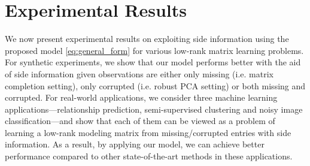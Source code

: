 \documentclass[twoside,11pt]{article}
\begin{document}
\section{Experimental Results}
\label{sec:exp}
We now present experimental results on exploiting side information using the proposed
model \eqref{eq:general_form} for various low-rank matrix learning problems.
For synthetic experiments, we show that
our model performs better with the aid of side information
given observations are either only missing (i.e. matrix
completion setting), only corrupted (i.e. robust PCA setting) or both missing and corrupted.
For real-world applications, we consider three machine learning applications---relationship prediction,
semi-supervised clustering and noisy image classification---and show that each of them can be
viewed as a problem of learning a low-rank modeling matrix from missing/corrupted entries
with side information.  As a result,
by applying our model, we can achieve better performance
compared to other state-of-the-art methods in these applications.
\end{document}
